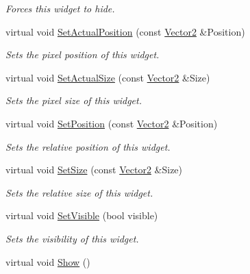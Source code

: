 \begin{DoxyCompactItemize}
\begin{DoxyCompactList}\small\item\em Forces this widget to hide. \item\end{DoxyCompactList}\item 
virtual void \hyperlink{classphys_1_1UI_1_1DropDownList_af4d36a88b9629284d22d023bdcfd4074}{SetActualPosition} (const \hyperlink{classphys_1_1Vector2}{Vector2} \&Position)
\begin{DoxyCompactList}\small\item\em Sets the pixel position of this widget. \item\end{DoxyCompactList}\item 
virtual void \hyperlink{classphys_1_1UI_1_1DropDownList_ad85c38f98f467565f2b895993ab92f96}{SetActualSize} (const \hyperlink{classphys_1_1Vector2}{Vector2} \&Size)
\begin{DoxyCompactList}\small\item\em Sets the pixel size of this widget. \item\end{DoxyCompactList}\item 
virtual void \hyperlink{classphys_1_1UI_1_1DropDownList_a91dbfd382be8c505021739602a7a64e6}{SetPosition} (const \hyperlink{classphys_1_1Vector2}{Vector2} \&Position)
\begin{DoxyCompactList}\small\item\em Sets the relative position of this widget. \item\end{DoxyCompactList}\item 
virtual void \hyperlink{classphys_1_1UI_1_1DropDownList_aebcb4fe708e7d1af4609120039e276a6}{SetSize} (const \hyperlink{classphys_1_1Vector2}{Vector2} \&Size)
\begin{DoxyCompactList}\small\item\em Sets the relative size of this widget. \item\end{DoxyCompactList}\item 
virtual void \hyperlink{classphys_1_1UI_1_1DropDownList_ac86730fe238d990505667bb9a475fb77}{SetVisible} (bool visible)
\begin{DoxyCompactList}\small\item\em Sets the visibility of this widget. \item\end{DoxyCompactList}\item 
\hypertarget{classphys_1_1UI_1_1DropDownList_aa30bdfe138516a0f51efa2034cd9f595}{
virtual void \hyperlink{classphys_1_1UI_1_1DropDownList_aa30bdfe138516a0f51efa2034cd9f595}{Show} ()}
\label{classphys_1_1UI_1_1DropDownList_aa30bdfe138516a0f51efa2034cd9f595}


\end{DoxyCompactItemize}
